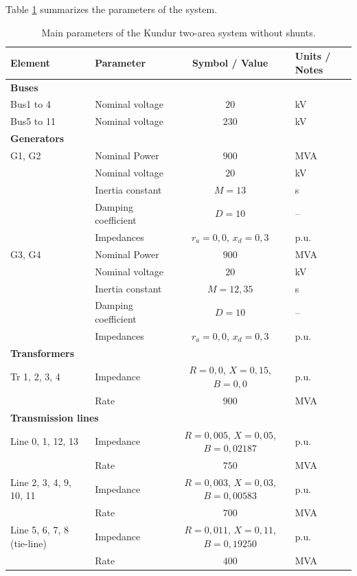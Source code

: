 Table \ref{tab:properties_kundur} summarizes the parameters of the system.

\begin{table}[H]
\centering
\caption{Main parameters of the Kundur two-area system without shunts.}
\label{tab:properties_kundur}
\renewcommand{\arraystretch}{1.2}
\small
\begin{tabular}{llcl}
\hline
\textbf{Element} & \textbf{Parameter} & \textbf{Symbol / Value} & \textbf{Units / Notes} \\ 
\hline

\multicolumn{4}{l}{\textbf{Buses}} \\ 
\hline
Bus1 to 4 & Nominal voltage & $20$ & kV \\ 
Bus5 to 11 & Nominal voltage & $230$ & kV \\ 
\hline

\multicolumn{4}{l}{\textbf{Generators}} \\ 
\hline
G1, G2 & Nominal Power & $900$ & MVA \\ 
       & Nominal voltage & $20$ & kV \\ 
       & Inertia constant & $M = 13$ & s \\ 
       & Damping coefficient & $D = 10$ & -- \\ 
       & Impedances & $r_a = 0,0$, $x_d = 0,3$ & p.u. \\ 
\hline
G3, G4 & Nominal Power & $900$ & MVA \\ 
       & Nominal voltage & $20$ & kV \\ 
       & Inertia constant & $M = 12,35$ & s \\ 
       & Damping coefficient & $D = 10$ & -- \\ 
       & Impedances & $r_a = 0,0$, $x_d = 0,3$ & p.u. \\ 
\hline

\multicolumn{4}{l}{\textbf{Transformers}} \\ 
\hline
Tr 1, 2, 3, 4 & Impedance & $R = 0,0$, $X = 0,15$, $B = 0,0$ & p.u. \\ 
               & Rate & $900$ & MVA \\ 
\hline

\multicolumn{4}{l}{\textbf{Transmission lines}} \\ 
\hline
Line 0, 1, 12, 13 & Impedance & $R = 0,005$, $X = 0,05$, $B = 0,02187$ & p.u. \\ 
                   & Rate & $750$ & MVA \\ 
\hline
Line 2, 3, 4, 9, 10, 11 & Impedance & $R = 0,003$, $X = 0,03$, $B = 0,00583$ & p.u. \\ 
                         & Rate & $700$ & MVA \\ 
\hline
Line 5, 6, 7, 8 (tie-line) & Impedance & $R = 0,011$, $X = 0,11$, $B = 0,19250$ & p.u. \\ 
                            & Rate & $400$ & MVA \\ 
\hline


\end{tabular}
\end{table}

